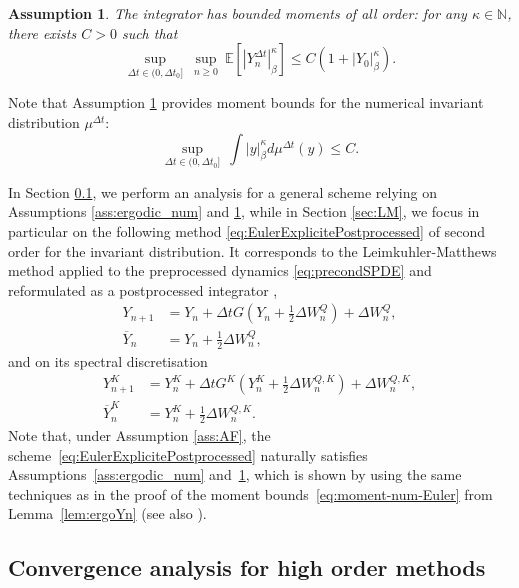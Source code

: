 \documentclass[11pt]{amsart}
\newcommand{\E}{\mathbb{E}}
\newcommand{\N}{\mathbb{N}}
\newtheorem{ass}{Assumption}
\begin{document}
\begin{ass}
\label{ass:bounded_mom}
The integrator has bounded moments of all order: for any $\kappa\in\N$, there exists $C>0$ such that
\[
\underset{\Delta t\in(0,\Delta t_0]}\sup~\underset{n\ge 0}\sup~\E[|Y_n^{\Delta t}|_\beta^\kappa]\le C(1+|Y_0|_\beta^\kappa).
\]
\end{ass}

Note that Assumption \ref{ass:bounded_mom} provides moment bounds for the numerical invariant distribution $\mu^{\Delta t}$:
\[
\underset{\Delta t\in(0,\Delta t_0]}\sup~\int |y|_\beta^\kappa d\mu^{\Delta t}(y)\le C.
\]

In Section \ref{sec:analysis_high_order_sampling}, we perform an analysis for a general scheme relying on Assumptions \ref{ass:ergodic_num} and \ref{ass:bounded_mom}, while in Section \ref{sec:LM}, we focus in particular on the following method \eqref{eq:EulerExplicitePostprocessed} of second order for the invariant distribution.
It corresponds to the Leimkuhler-Matthews method \cite{Leimkuhler13rco, Leimkuhler14otl} applied to the preprocessed dynamics \eqref{eq:precondSPDE} and reformulated as a postprocessed integrator \cite{Vilmart15pif},
\begin{equation}\label{eq:EulerExplicitePostprocessed}
\begin{aligned}
Y_{n+1}&=Y_n+\Delta tG(Y_n+\frac12\Delta W_n^Q)+\Delta W_n^Q,\\
\overline{Y}_n&=Y_n+\frac12\Delta W_n^Q,
\end{aligned}
\end{equation}
and on its spectral discretisation
\begin{align*}
Y_{n+1}^K&=Y_n^K+\Delta tG^K(Y_n^K+\frac12\Delta W_n^{Q,K})+\Delta W_n^{Q,K},\\
\overline{Y}_n^K&=Y_n^K+\frac12\Delta W_n^{Q,K}.
\end{align*}
%
Note that, under Assumption \ref{ass:AF}, the scheme~\eqref{eq:EulerExplicitePostprocessed} naturally satisfies Assumptions~\ref{ass:ergodic_num} and~\ref{ass:bounded_mom}, which is shown by using the same techniques as in the proof of the moment bounds~\eqref{eq:moment-num-Euler} from Lemma~\ref{lem:ergoYn} (see also \cite[Lemma 2.2]{Milstein04snf}).





\subsection{Convergence analysis for high order methods}
\label{sec:analysis_high_order_sampling}
\end{document}
